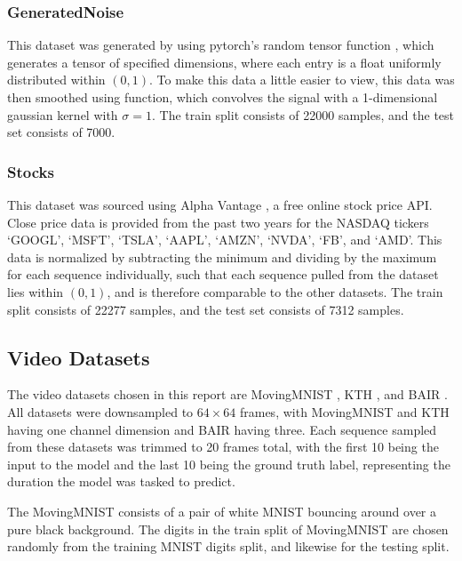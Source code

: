 \documentclass{scrartcl}
\begin{document}
\subsubsection{GeneratedNoise}
\label{subsubsec:generatednoise_dataset}

This dataset was generated by using pytorch's random tensor function
, which generates a tensor of specified dimensions,
where each entry is a float uniformly distributed within $(0, 1)$. To make this
data a little easier to view, this data was then smoothed using
 function, which convolves
the signal with a 1-dimensional gaussian kernel with $\sigma = 1$. The train
split consists of 22000 samples, and the test set consists of 7000.

\subsubsection{Stocks}
\label{subsubsec:stocks_dataset}

This dataset was sourced using Alpha Vantage \cite{alpha_vantage}, a free
online stock price API. Close price data is provided from the past two years
for the NASDAQ tickers `GOOGL', `MSFT', `TSLA', `AAPL', `AMZN', `NVDA', `FB',
and `AMD'. This data is normalized by subtracting the minimum and dividing by
the maximum for each sequence individually, such that each sequence pulled from
the dataset lies within $(0, 1)$, and is therefore comparable to the other
datasets. The train split consists of 22277 samples, and the test set consists
of 7312 samples.

\subsection{Video Datasets}
\label{subsec:video_datasets}

The video datasets chosen in this report are MovingMNIST \cite{mmnist_dataset},
KTH \cite{kth_dataset}, and BAIR \cite{bair_dataset}. All datasets were
downsampled to $64 \times 64$ frames, with MovingMNIST and KTH having one
channel dimension and BAIR having three. Each sequence sampled from these
datasets was trimmed to 20 frames total, with the first 10 being the input to
the model and the last 10 being the ground truth label, representing the
duration the model was tasked to predict.

The MovingMNIST consists of a pair of white MNIST \cite{mnist_digits} bouncing
around over a pure black background. The digits in the train split of
MovingMNIST are chosen randomly from the training MNIST digits split, and
likewise for the testing split.
\end{document}
